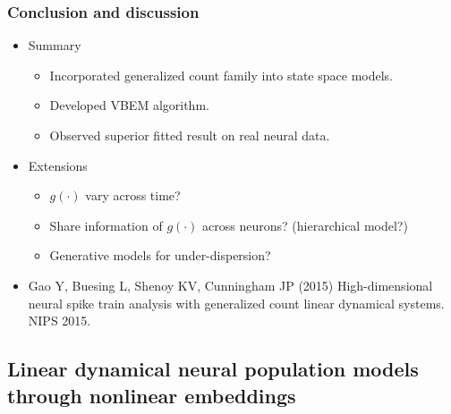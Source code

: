 \documentclass[16pt,presentation]{beamer}
\begin{document}
\begin{frame}
\begin{center}
\begin{tabular}[t]{cc}
\end{tabular}
\end{center}
\end{frame}



\begin{frame}
\frametitle{Conclusion and discussion}
\begin{itemize}
\item Summary
\begin{itemize}
\item Incorporated generalized count family into state space models.
\item Developed VBEM algorithm.
\item Observed superior fitted result on real neural data.
\end{itemize}
\item Extensions
\begin{itemize}
\item $g(\cdot)$ vary across time?
\item Share information of $g(\cdot)$ across neurons? (hierarchical model?)
\item Generative models for under-dispersion?
\end{itemize}
\item \alert{Gao Y}, Buesing L, Shenoy KV, Cunningham JP (2015) High-dimensional neural spike train analysis with generalized count linear dynamical systems. NIPS 2015.
\end{itemize}
\end{frame}



\subsection[]{Linear dynamical neural population models through nonlinear embeddings}
\end{document}
